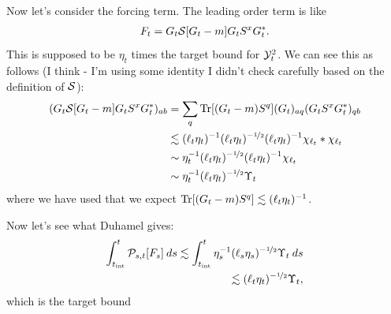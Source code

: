 \documentclass[11pt]{amsart}
\begin{document}
Now let's consider the forcing term. The leading order term is like 
\begin{align*}
F_t = G_{t} \mathcal{S}[G_{t} - m] G_{t} S^{x} G_{t}^{*}.
\end{align*}
This is supposed to be $\eta_t$ times the target bound for $\mathcal{Y}^{2}_t$.
We can see this as follows (I think - I'm using some identity I didn't check carefully based on the definition of $\mathcal{S}$):
\begin{align*}
(G_{t} \mathcal{S}[G_{t} - m] G_{t} S^{x} G_{t}^{*})_{ab} 
&= \sum_q \operatorname{Tr}[(G_t - m) S^{q}] (G_{t})_{aq} (G_t S^{x} G_{t}^{*})_{qb}\\
&\lesssim (\ell_t \eta_t)^{-1} (\ell_t \eta_t)^{-\nicefrac 12} (\ell_t \eta_t)^{-1} \chi_{\ell_t} * \chi_{\ell_t}\\
&\sim \eta_t^{-1}  (\ell_t \eta_t)^{-\nicefrac 12} (\ell_t \eta_t)^{-1} \chi_{\ell_t}\\
&\sim \eta_t^{-1} (\ell_t \eta_t)^{-\nicefrac 12} \Upsilon_{t}
\end{align*} 
where we have used that we expect $\operatorname{Tr}[(G_t - m) S^{q}] \lesssim (\ell_t \eta_t)^{-1}$.

Now let's see what Duhamel gives:
\begin{align*}
\int_{t_{\text{int}}}^{t}  \mathcal{P}_{s,t}[F_s] \:ds 
\lesssim \int_{t_{\text{int}}}^{t} \eta_s^{-1} (\ell_s \eta_s)^{-\nicefrac 12} \Upsilon_t \:ds\\
\lesssim (\ell_t \eta_t)^{-\nicefrac 12} \Upsilon_t,
\end{align*}
which is the target bound \smiley
\end{document}
